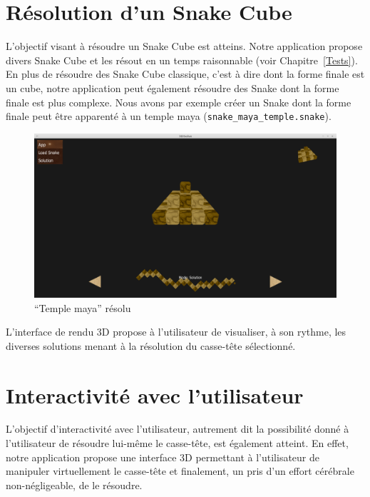 \section{Résolution d'un Snake Cube}
L'objectif visant à résoudre un Snake Cube est atteins. Notre application propose divers Snake Cube et les résout en un temps raisonnable (voir Chapitre~\ref{Tests}). En plus de résoudre des Snake Cube classique, c'est à dire dont la forme finale est un cube, notre application peut également résoudre des Snake dont la forme finale est plus complexe. Nous avons par exemple créer un Snake dont la forme finale peut être apparenté à un temple maya (\verb|snake_maya_temple.snake|).

\begin{figure}[h]
 \centering
 \includegraphics[scale=0.3,keepaspectratio=true]{img/screenShot3.png}
 \caption{``Temple maya'' résolu}
 \label{screenShot3}
\end{figure}

L'interface de rendu 3D propose à l'utilisateur de visualiser, à son rythme, les diverses solutions menant à la résolution du casse-tête sélectionné.

\newpage
\section{Interactivité avec l'utilisateur}
L'objectif d'interactivité avec l'utilisateur, autrement dit la possibilité donné à l'utilisateur de résoudre lui-même le casse-tête, est également atteint. En effet, notre application propose une interface 3D permettant à l'utilisateur de manipuler virtuellement le casse-tête et finalement, un pris d'un effort cérébrale non-négligeable, de le résoudre.


